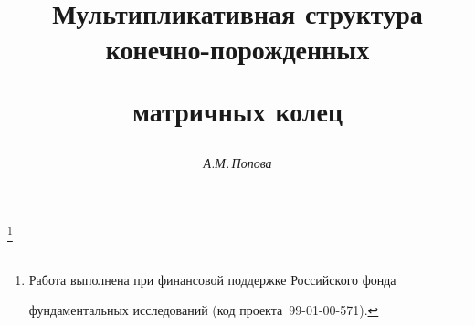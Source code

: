 




%


\newcommand{\la}{\langle}


\newcommand{\ra}{\rangle}


\newcommand{\gr}{\text{\,гр\,}} %


\newcommand{\diag}{\operatorname{diag}}


\newcommand{\tts}[1]{} 


\renewcommand{\baselinestretch}{0.99}










\setcounter{page}{51}















\author{\it А.М.\,Попова }




\title{Мультипликативная структура конечно-порожденных


матричных колец}


\thanks{Работа выполнена при финансовой поддержке Российского фонда


фундаментальных исследований (код проекта \No\,99-01-00-571).}





\date{}




\pagestyle{plain} %






